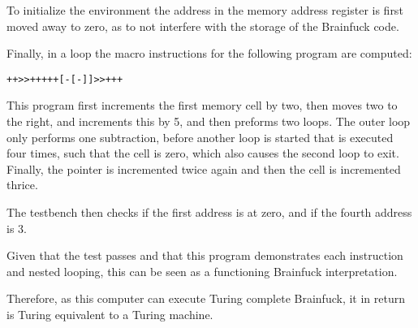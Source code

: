 To initialize the environment the address in the memory address register is first moved away to zero, as to not interfere with the storage of the Brainfuck code.

Finally, in a loop the macro instructions for the following program are computed: 

\begin{lstlisting}[caption=Brainfuck program, label=lst:brainfuck]
    ++>>+++++[-[-]]>>+++
\end{lstlisting}

This program first increments the first memory cell by two, then moves two to the right, and increments this by 5, and then preforms two loops. The outer loop only performs one subtraction, before another loop is started that is executed four times, such that the cell is zero, which also causes the second loop to exit. Finally, the pointer is incremented twice again and then the cell is incremented thrice. 

The testbench then checks if the first address is at zero, and if the fourth address is 3.

Given that the test passes and that this program demonstrates each instruction and nested looping, this can be seen as a functioning Brainfuck interpretation.

Therefore, as this computer can execute Turing complete Brainfuck, it in return is Turing equivalent to a Turing machine.